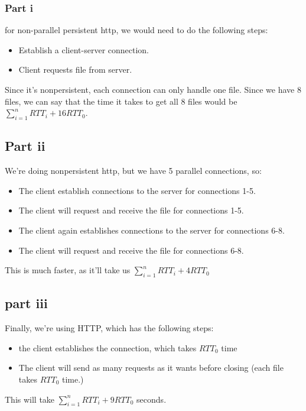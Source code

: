 \documentclass{article}
\begin{document}
\subsubsection{Part i}
for non-parallel persistent http, we would need to do the following steps:
\begin{itemize}
    \item Establish a client-server connection.
    \item Client requests file from server.
\end{itemize}

Since it's nonpersistent, each connection can only handle one file. Since we have 8 files, we can say that the time it takes to get all 8 files would be $\sum_{i = 1}^{n} RTT_i + 16RTT_0$.

\subsection{Part ii}

We're doing nonpersistent http, but we have 5 parallel connections, so:

\begin{itemize}
    \item The client establish connections to the server for connections 1-5.
    \item The client will request and receive the file for connections 1-5.
    \item The client again establishes connections to the server for connections 6-8.
    \item The client will request and receive the file for connections 6-8.
\end{itemize}

This is much faster, as it'll take us $\sum_{i = 1}^{n} RTT_i + 4RTT_0$

\subsection{part iii}

Finally, we're using HTTP, which has the following steps:

\begin{itemize}
    \item the client establishes the connection, which takes $RTT_0$ time
    \item The client will send as many requests as it wants before closing (each file takes $RTT_0$ time.)
\end{itemize}

This will take $\sum_{i = 1}^{n} RTT_i + 9RTT_0$ seconds.
\end{document}
